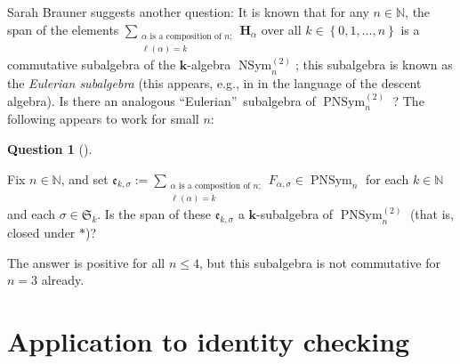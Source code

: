 \documentclass[numbers=enddot,12pt,final,onecolumn,notitlepage]{scrartcl}%
\theoremstyle{definition}
\newtheorem{quest}[theo]{Question}
\newenvironment{question}[1][]
{\begin{quest}[#1]\begin{leftbar}}
{\end{leftbar}\end{quest}}
\newenvironment{question}[1][Question]{\noindent\textbf{#1.} }{\ \rule{0.5em}{0.5em}}
\let\sumnonlimits\sum
\renewcommand{\sum}{\sumnonlimits\limits}
\begin{document}
Sarah Brauner suggests another question: It is known that for any
$n\in\mathbb{N}$, the span of the elements $\sum_{\substack{\alpha\text{ is a
composition of }n;\\\ell\left(  \alpha\right)  =k}}\mathbf{H}_{\alpha}$ over
all $k\in\left\{  0,1,\ldots,n\right\}  $ is a commutative subalgebra of the
$\mathbf{k}$-algebra $\operatorname*{NSym}\nolimits_{n}^{\left(  2\right)  }$;
this subalgebra is known as the \emph{Eulerian subalgebra} (this appears,
e.g., in \cite[\S 4.2]{Schocker} in the language of the descent algebra). Is
there an analogous \textquotedblleft Eulerian\textquotedblright\ subalgebra of
$\operatorname*{PNSym}\nolimits_{n}^{\left(  2\right)  }$ ? The following
appears to work for small $n$:

\begin{question}
Fix $n\in\mathbb{N}$, and set $\mathfrak{e}_{k,\sigma}:=\sum_{\substack{\alpha
\text{ is a composition of }n;\\\ell\left(  \alpha\right)  =k}}F_{\alpha
,\sigma}\in\operatorname*{PNSym}\nolimits_{n}$ for each $k\in\mathbb{N}$ and
each $\sigma\in\mathfrak{S}_{k}$. Is the span of these $\mathfrak{e}%
_{k,\sigma}$ a $\mathbf{k}$-subalgebra of $\operatorname*{PNSym}%
\nolimits_{n}^{\left(  2\right)  }$ (that is, closed under $\ast$)?
\end{question}

The answer is positive for all $n\leq4$, but this subalgebra is not
commutative for $n=3$ already.

\section{\label{sec.idcheck}Application to identity checking}
\end{document}
